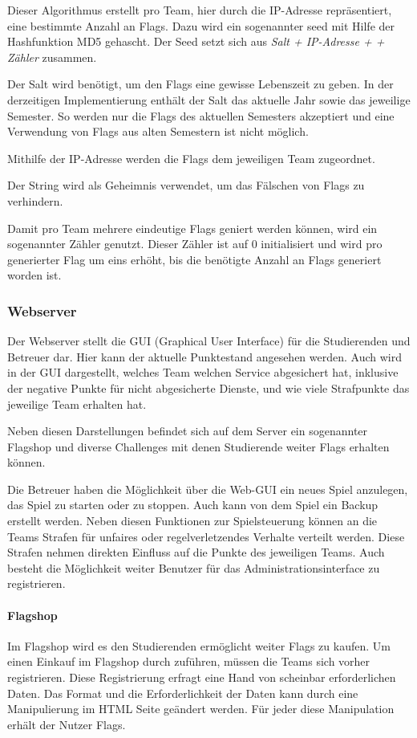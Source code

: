 Dieser Algorithmus erstellt pro Team, hier durch die IP-Adresse repräsentiert, eine bestimmte Anzahl an Flags. Dazu wird ein sogenannter seed mit Hilfe der Hashfunktion MD5 gehascht. Der Seed setzt sich aus \textit{Salt + IP-Adresse +  + Zähler} zusammen.

Der Salt wird benötigt, um den Flags eine gewisse Lebenszeit zu geben. In der derzeitigen Implementierung enthält der Salt das aktuelle Jahr sowie das jeweilige Semester. So werden nur die Flags des aktuellen Semesters akzeptiert und eine Verwendung von Flags aus alten Semestern ist nicht möglich.

Mithilfe der IP-Adresse werden die Flags dem jeweiligen Team zugeordnet.

Der String  wird als Geheimnis verwendet, um das Fälschen von Flags zu verhindern.

Damit pro Team mehrere eindeutige Flags geniert werden können, wird ein sogenannter Zähler genutzt. Dieser Zähler ist auf 0 initialisiert und wird pro generierter Flag um eins erhöht, bis die benötigte Anzahl an Flags generiert worden ist.\cite[S.48]{sosnaKonzeptionUndRealisierung2010}

\subsubsection{Webserver}\label{subsubsec:Webserver}

Der Webserver stellt die GUI (Graphical User Interface) für die Studierenden und Betreuer dar. Hier kann der aktuelle Punktestand angesehen werden. Auch wird in der GUI dargestellt, welches Team welchen Service abgesichert hat, inklusive der negative Punkte für nicht abgesicherte Dienste, und wie viele Strafpunkte das jeweilige Team erhalten hat.

Neben diesen Darstellungen befindet sich auf dem Server ein sogenannter Flagshop und diverse Challenges mit denen Studierende weiter Flags erhalten können.

Die Betreuer haben die Möglichkeit über die Web-GUI ein neues Spiel anzulegen, das Spiel zu starten oder zu stoppen. Auch kann von dem Spiel ein Backup erstellt werden. Neben diesen Funktionen zur Spielsteuerung können an die Teams Strafen für unfaires oder regelverletzendes Verhalte verteilt werden. Diese Strafen nehmen direkten Einfluss auf die Punkte des jeweiligen Teams. Auch besteht die Möglichkeit weiter Benutzer für das Administrationsinterface zu registrieren.

\paragraph{Flagshop} \label{para:Flagshop}
Im Flagshop wird es den Studierenden ermöglicht weiter Flags zu kaufen. Um einen Einkauf im Flagshop durch zuführen, müssen die Teams sich vorher registrieren. Diese Registrierung erfragt eine Hand von scheinbar erforderlichen Daten. Das Format und die Erforderlichkeit der Daten kann durch eine Manipulierung im HTML Seite geändert werden. Für jeder diese Manipulation erhält der Nutzer Flags.

